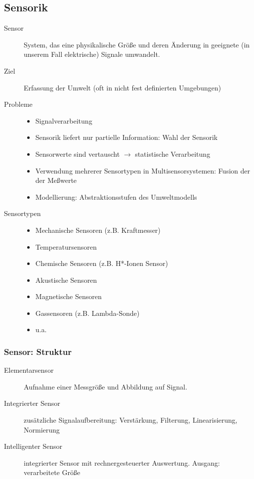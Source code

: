 \subsection{Sensorik}

\begin{description}
\item[Sensor] System, das eine physikalische Größe und deren Änderung in geeignete (in unserem Fall elektrische) Signale umwandelt.
\item[Ziel] Erfassung der Umwelt (oft in nicht fest definierten Umgebungen)
\item[Probleme] \quad
\begin{itemize}
\item Signalverarbeitung
\item Sensorik liefert nur partielle Information: Wahl der Sensorik
\item Sensorwerte sind vertauscht $\to$ statistische Verarbeitung
\item Verwendung mehrerer Sensortypen in Multisensorsystemen: Fusion der der Meßwerte
\item Modellierung: Abstraktionsstufen des Umweltmodells
\end{itemize}
\item[Sensortypen] \quad
\begin{itemize}
\item Mechanische Sensoren (z.B. Kraftmesser)
\item Temperatursensoren
\item Chemische Sensoren (z.B. H*-Ionen Sensor)
\item Akustische Sensoren
\item Magnetische Sensoren
\item Gassensoren (z.B. Lambda-Sonde)
\item u.a.
\end{itemize}
\end{description}

\subsubsection{Sensor: Struktur}

\begin{description}
\item[Elementarsensor] Aufnahme einer Messgröße und Abbildung auf Signal.
\item[Integrierter Sensor] zusätzliche Signalaufbereitung: Verstärkung, Filterung, Linearisierung, Normierung
\item[Intelligenter Sensor] integrierter Sensor mit rechnergesteuerter Auswertung. Ausgang: verarbeitete Größe
\end{description}

